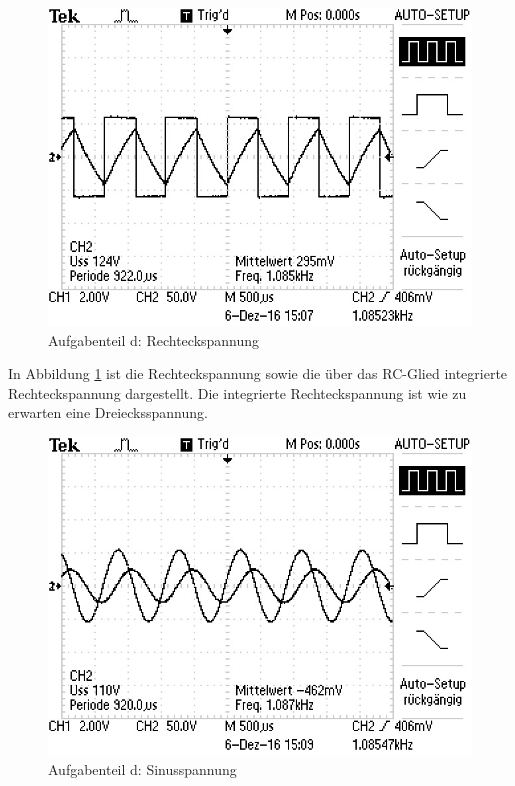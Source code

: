 \begin{figure}
	\centering
	\includegraphics[angle=90]{bilder/ALL0001/F0001TEK.JPG}
	\caption{Aufgabenteil d: Rechteckspannung}
	\label{fig:rechteck}
\end{figure}

In Abbildung \ref{fig:rechteck} ist die Rechteckspannung sowie die über das RC-Glied integrierte Rechteckspannung dargestellt.
Die integrierte Rechteckspannung ist wie zu erwarten eine Dreiecksspannung.


\begin{figure}
	\centering
	\includegraphics[angle=90]{bilder/ALL0002/F0002TEK.JPG}
	\caption{Aufgabenteil d: Sinusspannung}
	\label{fig:sinus}
\end{figure}

